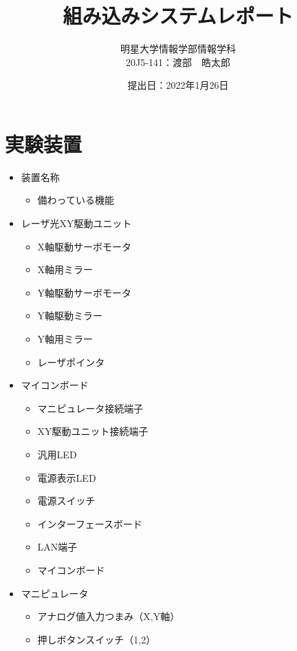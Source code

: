 \documentclass{jarticle}
\title{組み込みシステムレポート}
\author{明星大学情報学部情報学科\\
  20J5-141：渡部　皓太郎} %
\date{提出日：2022年1月26日} %
\begin{document}
\maketitle



\section{実験装置}
\begin{itemize}
    
    \item 装置名称
     \begin{itemize}
         \item 備わっている機能
     \end{itemize}
    
    \item レーザ光XY駆動ユニット
    \begin{itemize}
        \item X軸駆動サーボモータ
        \item X軸用ミラー
        \item Y軸駆動サーボモータ
        \item Y軸駆動ミラー
        \item Y軸用ミラー
        \item レーザポインタ
        
    \end{itemize}
    \item マイコンボード
    \begin{itemize}
        \item マニピュレータ接続端子
        \item XY駆動ユニット接続端子
        \item 汎用LED
        \item 電源表示LED
        \item 電源スイッチ
        \item インターフェースボード
        \item LAN端子
        \item マイコンボード
    \end{itemize}

    \item マニピュレータ
    \begin{itemize}
        \item アナログ値入力つまみ（X,Y軸）
        \item 押しボタンスイッチ（1,2）
    \end{itemize}
\end{itemize}
\end{document}
